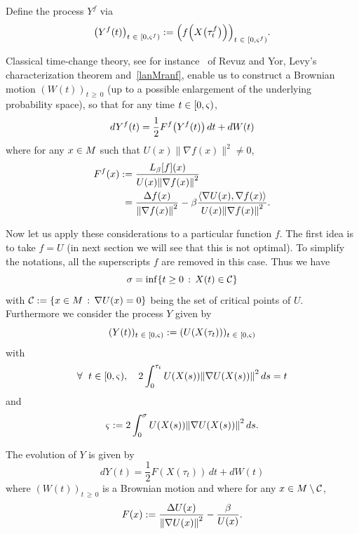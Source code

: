 \documentclass[AHL,Unicode,longabstracts,published]{cedram}
\newcommand{\f}[2]{\frac{#1}{#2}}
\newcommand{\cC}{\mathcal{C}}
\newcommand{\na}{\nabla}
\newcommand{\tr}{\Delta}
\newcommand{\fo}{\forall\ }
\let\originalleft\left
\let\originalright\right
\renewcommand{\left}{\mathopen{}\mathclose\bgroup\originalleft}
\renewcommand{\right}{\aftergroup\egroup\originalright}
\let\oldin\in
\renewcommand{\in}{\mathchoice{\oldin}{\oldin}{\,\oldin\,}{\,\oldin\,}}
\newcommand*{\Mk}{\mkern -2mu}
\newcommand*{\MK}{\mkern 2mu}
\let\oldforall\forall
\renewcommand*{\forall}{\mathrel{\oldforall}}
\begin{document}
Define the process $Y^f$ via
\begin{equation*}
\left(Y^f(t)\right)_{t\in \left[0,\varsigma^f\right)} := \left(f\left(X\bigl(\tau^f_t\bigr)\right)\right)_{t\in \left[0,\varsigma^f\right)}.
\end{equation*}


Classical time-change theory, see for instance~\cite[Section~1, Chapter~5]{MR1725357} of Revuz and Yor, Levy's characterization theorem and~\eqref{lanMranf}, enable us to construct a Brownian motion $(W(t))_{t\,\geq\,0}$ (up to a possible enlargement of the underlying probability space), so that for any time $t\in[0,\varsigma)$,
\begin{equation*}
dY^f(t) = 
\f12F^f\left(Y^f(t)\right) \, dt +dW(t)
\end{equation*}
where for any $x\in M$ such that $U(x)\| \na f(x)\|^2\neq 0$,
\begin{align*}
F^f(x)\,\MK &\!\Mk:= \f{L_\beta[f](x)}{U(x)\left\| \na f(x)\right\|^2}\\
&= 
\f{\tr f(x)}{\left\| \na f(x)\right\|^2}-\beta\f{\left\langle\na U(x),\na f(x)\right\rangle}{U(x)\left\| \na f(x)\right\|^2}.
\end{align*}

Now let us apply these considerations to a particular function $f$. The first idea is to take $f=U$ (in next section we will see that this is not optimal). To simplify the notations, all the superscripts $f$ are removed in this case. Thus we have
\begin{equation*}
\sigma = \inf\{t\geq 0\,:\, X(t)\in\cC\}
\end{equation*}
with $\cC:=\{x\in M\,:\, \na U(x)=0\}$ being the set of critical points of $U$. Furthermore we consider the process $Y$ given by
\begin{equation*}
(Y(t))_{t\in [0,\varsigma)} := (U(X(\tau_t)))_{t\in [0,\varsigma)}
\end{equation*}
with
\begin{equation*}
\fo t\in[0,\varsigma),\quad 2\int_0^{\tau_t} U(X(s))\left\| \na U(X(s))\right\|^2\, ds = t
\end{equation*}
and
\begin{equation*}
\varsigma := 2\int_0^{\sigma} U(X(s))\left\| \na U(X(s))\right\|^2\, ds.
\end{equation*}


The evolution of $Y$ is given by
\begin{equation}\label{Y}
dY(t) =
\f12F(X(\tau_t)) \, dt +dW(t)
\end{equation}
where $(W(t))_{t\,\geq\,0}$ is a Brownian motion and where for any $x\in M\setminus\cC$,
\begin{equation*}
F(x) := 
\f{\tr U(x)}{\left\| \na U(x)\right\|^2}-\f{\beta}{U(x)}.
\end{equation*}
\end{document}
